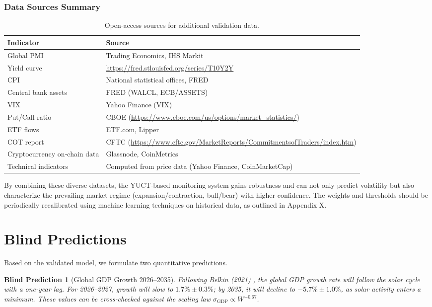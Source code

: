 \documentclass[11pt,a4paper]{article}
\newtheorem{prediction}[theorem]{Blind Prediction}
\theoremstyle{remark}
\begin{document}
	\subsubsection{Data Sources Summary}
	\begin{table}[h]
		\centering
		\caption{Open‑access sources for additional validation data.}
		\label{tab:extra_sources}
		\begin{tabular}{ll}
			\toprule
			Indicator & Source \\
			\midrule
			Global PMI & Trading Economics, IHS Markit \\
			Yield curve & \url{https://fred.stlouisfed.org/series/T10Y2Y} \\
			CPI & National statistical offices, FRED \\
			Central bank assets & FRED (WALCL, ECB/ASSETS) \\
			VIX & Yahoo Finance (VIX) \\
			Put/Call ratio & CBOE (\url{https://www.cboe.com/us/options/market_statistics/}) \\
			ETF flows & ETF.com, Lipper \\
			COT report & CFTC (\url{https://www.cftc.gov/MarketReports/CommitmentsofTraders/index.htm}) \\
			Cryptocurrency on‑chain data & Glassnode, CoinMetrics \\
			Technical indicators & Computed from price data (Yahoo Finance, CoinMarketCap) \\
			\bottomrule
		\end{tabular}
	\end{table}
	
	By combining these diverse datasets, the YUCT‑based monitoring system gains robustness and can not only predict volatility but also characterize the prevailing market regime (expansion/contraction, bull/bear) with higher confidence. The weights and thresholds should be periodically recalibrated using machine learning techniques on historical data, as outlined in Appendix X.
	
	\section{Blind Predictions}
	\label{sec:predictions}
	
	Based on the validated model, we formulate two quantitative predictions.
	
	\begin{prediction}[Global GDP Growth 2026–2035]
		Following Belkin (2021) \cite{Belkin2021}, the global GDP growth rate will follow the solar cycle with a one‑year lag. For 2026–2027, growth will slow to $1.7\% \pm 0.3\%$; by 2035, it will decline to $-5.7\% \pm 1.0\%$, as solar activity enters a minimum. These values can be cross‑checked against the scaling law $\sigma_{\text{GDP}} \propto W^{-0.67}$.
	\end{prediction}
	
\end{document}
